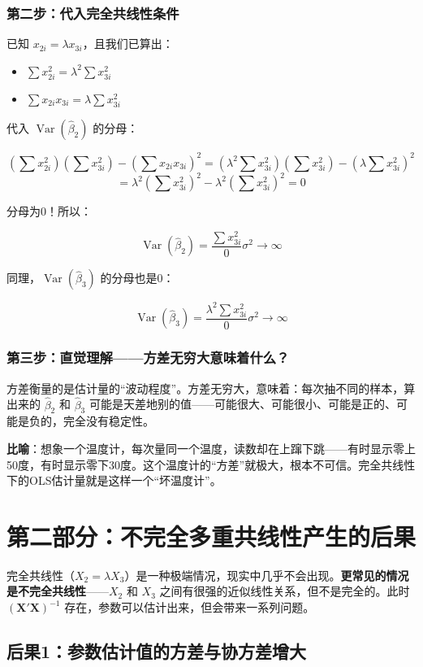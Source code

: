 \documentclass[12pt,a4paper]{ctexart}
\newcommand{\Var}{\operatorname{Var}}
\begin{document}
\subsubsection{第二步：代入完全共线性条件}

已知 $x_{2i} = \lambda x_{3i}$，且我们已算出：
\begin{itemize}
    \item $\sum x_{2i}^2 = \lambda^2 \sum x_{3i}^2$
    \item $\sum x_{2i} x_{3i} = \lambda \sum x_{3i}^2$
\end{itemize}

代入 $\Var(\hat{\beta}_2)$ 的分母：

\[
(\sum x_{2i}^2)(\sum x_{3i}^2) - (\sum x_{2i} x_{3i})^2 = (\lambda^2 \sum x_{3i}^2)(\sum x_{3i}^2) - (\lambda \sum x_{3i}^2)^2
\]
\[
= \lambda^2 (\sum x_{3i}^2)^2 - \lambda^2 (\sum x_{3i}^2)^2 = 0
\]

分母为0！所以：

\[
\Var(\hat{\beta}_2) = \frac{\sum x_{3i}^2}{0} \sigma^2 \to \infty
\]

同理，$\Var(\hat{\beta}_3)$ 的分母也是0：

\[
\Var(\hat{\beta}_3) = \frac{\lambda^2 \sum x_{3i}^2}{0} \sigma^2 \to \infty
\]

\subsubsection{第三步：直觉理解——方差无穷大意味着什么？}

方差衡量的是估计量的“波动程度”。方差无穷大，意味着：每次抽不同的样本，算出来的 $\hat{\beta}_2$ 和 $\hat{\beta}_3$ 可能是天差地别的值——可能很大、可能很小、可能是正的、可能是负的，完全没有稳定性。

\textbf{比喻}：想象一个温度计，每次量同一个温度，读数却在上蹿下跳——有时显示零上50度，有时显示零下30度。这个温度计的“方差”就极大，根本不可信。完全共线性下的OLS估计量就是这样一个“坏温度计”。

\section{第二部分：不完全多重共线性产生的后果}

完全共线性（$X_2 = \lambda X_3$）是一种极端情况，现实中几乎不会出现。\textbf{更常见的情况是不完全共线性}——$X_2$ 和 $X_3$ 之间有很强的近似线性关系，但不是完全的。此时 $(\mathbf{X}'\mathbf{X})^{-1}$ 存在，参数可以估计出来，但会带来一系列问题。

\subsection{后果1：参数估计值的方差与协方差增大}
\end{document}
